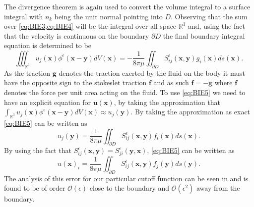 The divergence theorem is again used to convert the volume integral to a surface integral with $n_k$ being the unit normal pointing into $D$. Observing that the sum over \cref{eq:BIE3,eq:BIE4} will be the integral over all space $\mathbb{R}^{3}$ and, using the fact that the velocity is continuous on the boundary $\partial D$ the final boundary integral equation is determined to be
\begin{equation}
  \label{eq:BIE5}
    \iiint_{\mathbb{R}^{3}} u_{j}(\bm{x}) \phi^{\epsilon}\left(\bm{x}-\bm{y}\right) d V(\bm{x})=-\frac{1}{8 \pi \mu} \iint_{\partial D} S_{i j}^{\epsilon}\left(\bm{x}, \bm{y}\right) g_{i}(\bm{x}) d s(\bm{x}).
\end{equation}
As the traction $\bm{g}$ denotes the traction exerted by the fluid on the body it must have the opposite sign to the stokeslet traction $\bm{f}$ and as such $\bm{f} = -\bm{g}$ where $\bm{f}$ denotes the force per unit area acting on the fluid. To use \cref{eq:BIE5} we need to have an explicit equation for $\bm{u}(\bm{x})$, by taking the approximation that $\int_{\mathbb{R}^{3}} u_{j}(\bm{x}) \phi^{\epsilon}\left(\bm{x}-\bm{y}\right) d V(\bm{x}) \approx u_j(\bm{y})$. By taking the approximation as exact \cref{eq:BIE5} can be written as
\begin{equation}
    u_j(\bm{y}) = \frac{1}{8 \pi \mu} \iint_{\partial D} S_{i j}^{\epsilon}\left(\bm{x}, \bm{y}\right) f_{i}(\bm{x}) d s(\bm{x}).
\end{equation}
By using the fact that $S_{i j}^{\epsilon}\left(\bm{x}, \bm{y}\right) = S_{j i}^{\epsilon}\left(\bm{y}, \bm{x}\right)$, \cref{eq:BIE5} can be written as 
\begin{equation}
  \label{eq:BIE}
    u(\bm{x})_i=\frac{1}{8 \pi \mu} \iint_{\partial D} S_{i j}^{\epsilon}\left(\bm{x}, \bm{y}\right) f_{j}(\bm{y}) d s(\bm{y}).
\end{equation}
The analysis of this error for our particular cutoff function can be seen in \cite{Cortez2005} and is found to be of order $\mathcal{O}(\epsilon)$ close to the boundary and $\mathcal{O}(\epsilon^2)$ away from the boundary.

